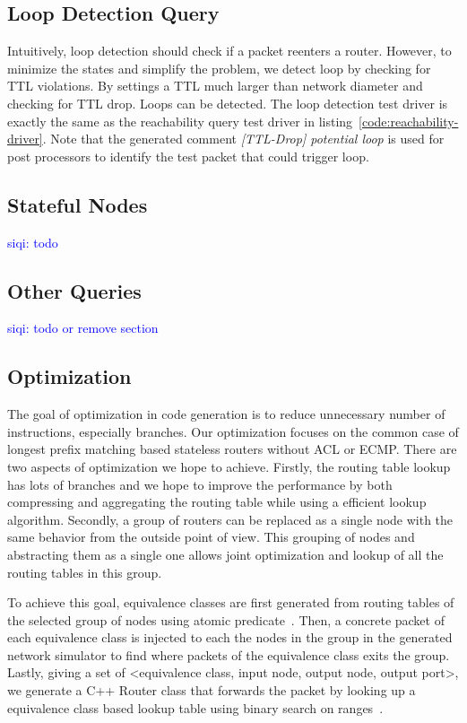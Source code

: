 \documentclass[letterpaper, 10 pt, conference]{ieeeconf}  %
\newcommand\siqi[1]{\textcolor{blue}{siqi: #1}}
\begin{document}
\subsection{Loop Detection Query}
Intuitively, loop detection should check if a packet reenters a router. However, to minimize the states and simplify the problem, we detect loop by checking for TTL violations. By settings a TTL much larger than network diameter and checking for TTL drop. Loops can be detected. The loop detection test driver is exactly the same as the reachability query test driver in listing~\ref{code:reachability-driver}. Note that the generated comment \emph{[TTL-Drop] potential loop} is used for post processors to identify the test packet that could trigger loop.
\subsection{Stateful Nodes}
\siqi{todo}
\subsection{Other Queries}
\siqi{todo or remove section}
\subsection{Optimization}\label{sec:opt}
The goal of optimization in code generation is to reduce unnecessary number of instructions, especially branches. Our optimization focuses on the common case of longest prefix matching based stateless routers without ACL or ECMP. There are two aspects of optimization we hope to achieve. Firstly, the routing table lookup has lots of branches and we hope to improve the performance by both compressing and aggregating the routing table while using a efficient lookup algorithm. Secondly, a group of routers can be replaced as a single node with the same behavior from the outside point of view. This grouping of nodes and abstracting them as a single one allows joint optimization and lookup of all the routing tables in this group.

To achieve this goal, equivalence classes are first generated from routing tables of the selected group of nodes using atomic predicate~\cite{ap}. Then, a concrete packet of each equivalence class is injected to each the nodes in the group in the generated network simulator to find where packets of the equivalence class exits the group. Lastly, giving a set of <equivalence class, input node, output node, output port>, we generate a C++ Router class that forwards the packet by looking up a equivalence class based lookup table using binary search on ranges~\cite{binary_search_lookup}.
\end{document}
